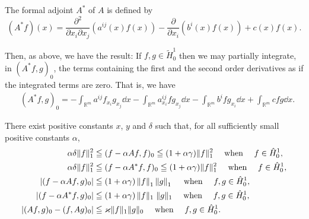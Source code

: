 \begin{remarku} The formal adjoint $A^{*}$ of $A$ is defined by 
\begin{equation}\label{eq:XIV.1.8}
(A ^{*} f) (x) = \frac {\partial^{2}}{\partial x _{i} \partial x _{j}} \left(a ^{ij} (x) f (x)\right) - \frac {\partial}{\partial x _{i}} \left(b ^{i} (x) f (x)\right) + c (x) f (x).
\end{equation}
\end{remarku}

Then, as above, we have the result: If $f, g \in \tilde{H}_0^1$ then we may partially integrate, in $(A^*f, g)_0$, the terms containing the first and the second order derivatives as if the integrated terms are zero. That is, we have 
\begin{equation}\tag{7'}\label{eq:XIV.1.7'}
\begin{aligned}
&(A ^{*} f, g) _{0} =  - \int_ {\mathbb{R}^{m}} a ^{ij} f _ {x _{i}} g _ {x _{j}} \dd x - \int_ {\mathbb{R}^{m}} a _ {x _{i}} ^{ij} f g _ {x _{j}} \dd x - \int_ {\mathbb{R}^{m}} b ^{i} f g _ {x _{i}} \dd x + \int_ {\mathbb{R}^{m}} c f g \dd x.
\end{aligned}
\end{equation}

\begin{corollaryu} There exist positive constants $x$, $y$ and $\delta$ such that, for all sufficiently small positive constants $\alpha$, 
\begin{align}
\alpha \delta \| f \| _{1} ^{2}& \leqq (f - \alpha A f, f) _{0} \leqq (1 + \alpha \gamma) \| f \| _{1} ^{2} \quad \text{ when } \quad f \in \hat {H} _{0} ^{1}, \label{eq:XIV.1.9} \\
\alpha \delta \| f \| _{1} ^{2}& \leqq (f - \alpha A ^{*} f, f) _{0} \leqq (1 + \alpha \gamma) \| f \| _{1} ^{2} \quad \text{ when } \quad f \in \hat {H} _{0} ^{1}, \notag \\
\left| (f - \alpha A f, g) _{0} \right|& \leqq (1 + \alpha \gamma) \left\| f \right\| _{1} \left\| g \right\| _{1} \quad \text{ when } \quad f, g \in \hat {H} _{0} ^{1}, \label{eq:XIV.1.10} \\
\left| (f - \alpha A ^{*} f, g) _{0} \right|& \leqq (1 + \alpha \gamma) \left\| f \| _{1} \right. \| g \| _{1} \quad \text{ when } \quad f, g \in \hat {H} _{0} ^{1}, \notag \\
\left| (A f, g) _{0} - (f, A g) _{0} \right|& \leqq \varkappa \| f \| _{1} \| g \| _{0} \quad \text{ when } \quad f, g \in \hat {H} _{0} ^{1}. \label{eq:XIV.1.11}
\end{align}
\end{corollaryu}

